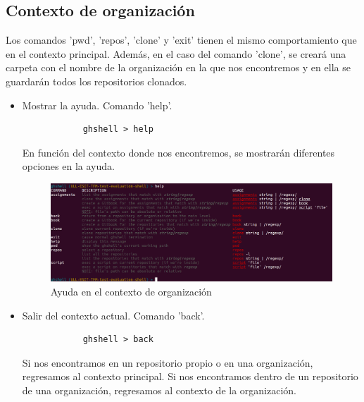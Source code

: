 \subsection{Contexto de organización}
\label{subsec:b.2.2}

	Los comandos 'pwd', 'repos', 'clone' y 'exit' tienen el mismo comportamiento que en el contexto principal. 
	\bigskip
	Además, en el caso del comando 'clone', se creará una carpeta con el nombre de la organización en la que nos encontremos y en ella se guardarán todos los repositorios clonados.
	
\begin{itemize}

	\item Mostrar la ayuda. Comando 'help'.
		
		\begin{verbatim}
			ghshell > help
		\end{verbatim}
		
		En función del contexto donde nos encontremos, se mostrarán diferentes opciones en la ayuda.
		
		\begin{figure}[H]
		\begin{center}
		\includegraphics[width=1\textwidth]{images/help1-2}
		\caption{Ayuda en el contexto de organización}
		\label{fig:help1-2}
		\end{center}
		\end{figure}
	
	\item Salir del contexto actual. Comando 'back'.
	
		\begin{verbatim}
			ghshell > back
		\end{verbatim}
		
		Si nos encontramos en un repositorio propio o en una organización, regresamos al contexto principal. Si nos encontramos dentro de un repositorio de una organización, regresamos al contexto de la organización.
		

\end{itemize}
